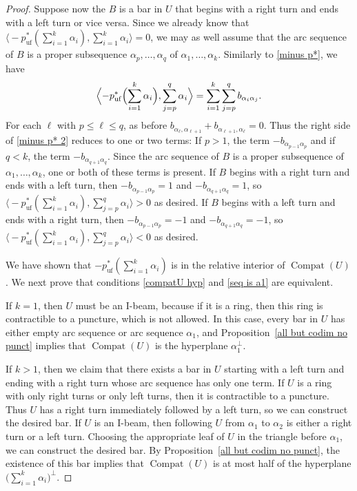 \documentclass{amsart}
\theoremstyle{definition}
\theoremstyle{remark}
\numberwithin{equation}{section}
\newcommand{\uf}{{\operatorname{uf}}}
\newcommand{\brr}[1]{{\bigl\langle #1 \bigr\rangle}}
\newcommand{\brrr}[1]{{\Bigl\langle #1 \Bigr\rangle}}
\newcommand{\0}{{\mathbf{0}}}
\newcommand{\Compat}{\operatorname{Compat}}
\begin{document}
\begin{proof}
Suppose now the $B$ is a bar in $U$ that begins with a right turn and ends with a left turn or vice versa.
Since we already know that $\brr{-p^*_\uf(\sum_{i=1}^k\alpha_i),\sum_{i=1}^k\alpha_i}=0$, we may as well assume that the arc sequence of $B$ is a proper subsequence $\alpha_p,\ldots,\alpha_q$ of $\alpha_1,\ldots,\alpha_k$.
Similarly to \eqref{minus p*}, we have 
\begin{equation}\label{minus p* 2}
\brrr{-p^*_\uf\Bigl(\sum_{i=1}^k\alpha_i\Bigr),\sum_{j=p}^q\alpha_i}=\sum_{i=1}^k\sum_{j=p}^q b_{\alpha_i\alpha_j}.
\end{equation}
For each $\ell$ with $p\le\ell\le q$, as before $b_{\alpha_\ell,\alpha_{\ell+1}}+b_{\alpha_{\ell+1},\alpha_\ell}=0$.
Thus the right side of \eqref{minus p* 2} reduces to one or two terms:
If $p>1$, the term $-b_{\alpha_{p-1}\alpha_p}$ and if $q<k$, the term $-b_{\alpha_{q+1}\alpha_q}$.
Since the arc sequence of $B$ is a proper subsequence of $\alpha_1,\ldots,\alpha_k$, one or both of these terms is present.
If $B$ begins with a right turn and ends with a left turn, then $-b_{\alpha_{p-1}\alpha_p}=1$ and $-b_{\alpha_{q+1}\alpha_q}=1$, so $\brr{-p^*_\uf(\sum_{i=1}^k\alpha_i),\sum_{j=p}^q\alpha_i}>0$ as desired.
If $B$ begins with a left turn and ends with a right turn, then $-b_{\alpha_{p-1}\alpha_p}=-1$ and $-b_{\alpha_{q+1}\alpha_q}=-1$, so $\brr{-p^*_\uf(\sum_{i=1}^k\alpha_i),\sum_{j=p}^q\alpha_i}<0$ as desired.

We have shown that $-p^*_\uf(\sum_{i=1}^k\alpha_i)$ is in the relative interior of $\Compat(U)$.
We next prove that conditions \eqref{compatU hyp} and \eqref{seq is a1} are equivalent.

If $k=1$, then $U$ must be an I-beam, because if it is a ring, then this ring is contractible to a puncture, which is not allowed.
In this case, every bar in $U$ has either empty arc sequence or arc sequence $\alpha_1$, and Proposition~\ref{all but codim no punct} implies that $\Compat(U)$ is the hyperplane $\alpha_1^\perp$.

If $k>1$, then we claim that there exists a bar in $U$ starting with a left turn and ending with a right turn whose arc sequence has only one term.
If $U$ is a ring with only right turns or only left turns, then it is contractible to a puncture.
Thus $U$ has a right turn immediately followed by a left turn, so we can construct the desired bar.
If $U$ is an I-beam, then following $U$ from $\alpha_1$ to $\alpha_2$ is either a right turn or a left turn.
Choosing the appropriate leaf of $U$ in the triangle before $\alpha_1$, we can construct the desired bar.
By Proposition~\ref{all but codim no punct}, the existence of this bar implies that $\Compat(U)$ is at most half of the hyperplane $\bigl(\sum_{i=1}^k\alpha_i\bigr)^\perp$.


\end{proof}
\end{document}
